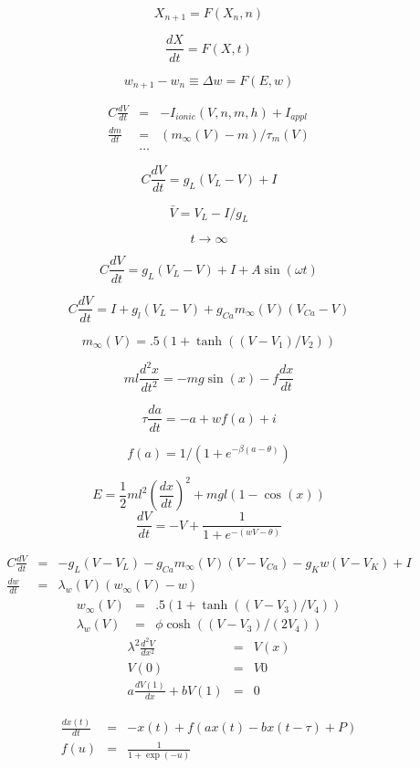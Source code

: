 
\[
 X_{n+1} = F(X_n,n)
\]

\[
\frac{dX}{dt} = F(X,t)
\]

\[
 w_{n+1} - w_n \equiv \Delta w = F(E,w)
\]

\begin{eqnarray*}
C\frac{dV}{dt} &=& -I_{ionic}(V,n,m,h) + I_{appl} \\
\frac{dm}{dt} &=& (m_\infty(V)-m)/\tau_m(V) \\
   &\ldots&
\end{eqnarray*}

\[
 C \frac{dV}{dt} = g_L(V_L-V) + I
\]


\[
\bar V = V_L-I/g_L
\]

\[
t\to\infty
\]

\[
 C \frac{dV}{dt} = g_L(V_L-V) + I+A \sin(\omega t)
\]

\[
 C\frac{dV}{dt} = I + g_l(V_L-V)+g_{Ca} m_\infty(V)(V_{Ca}-V)
\]

\[
 m_\infty(V) = .5(1+\tanh((V-V_1)/V_2))
\]

\[
ml\frac{d^2x}{dt^2} = - mg\sin(x)-f\frac{dx}{dt}
\]

\[
\tau\frac{da}{dt} = -a + wf(a)+i
\]

\[
 f(a) = 1/(1+e^{-\beta(a-\theta)})
\]
 
\[
 E = \frac{1}{2} ml^2\left(\frac{dx}{dt}\right)^2 + mgl(1-\cos(x))
\]
\[
\frac{dV}{dt} = -V + \frac{1}{1+e^{-(wV-\theta)}}
\]

\begin{eqnarray*}
C \frac{dV}{dt} &=& -g_L(V-V_L)-g_{Ca}m_\infty(V)(V-V_{Ca})-g_Kw(V-V_K) + I \\
\frac{dw}{dt} &=&\lambda_w(V)(w_\infty(V)-w)
\end{eqnarray*}
\begin{eqnarray*}
w_\infty(V) &=& .5(1+\tanh((V-V_3)/V_4)) \\
\lambda_w(V) &=& \phi\cosh((V-V_3)/(2V_4))
\end{eqnarray*}
\begin{eqnarray*}
\lambda^2\frac{d^2V}{dx^2} &=& V(x) \\
V(0)&=& V0 \\
a\frac{dV(1)}{dx} + b V(1) &=& 0
\end{eqnarray*}

\begin{eqnarray*}
\frac{dx(t)}{dt} &=& -x(t) + f(ax(t)-bx(t-\tau)+P) \\
f(u)&=& \frac{1}{1+\exp(-u)}
\end{eqnarray*}

